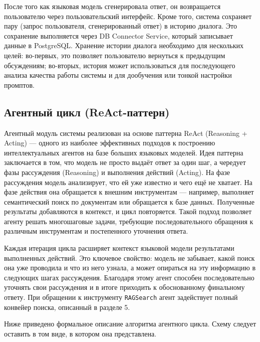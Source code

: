 После того как языковая модель сгенерировала ответ, он возвращается пользователю через пользовательский интерфейс. Кроме того, система сохраняет пару (запрос пользователя, сгенерированный ответ) в историю диалога. Это сохранение выполняется через DB Connector Service, который записывает данные в PostgreSQL. Хранение истории диалога необходимо для нескольких целей: во-первых, это позволяет пользователю вернуться к предыдущим обсуждениям; во-вторых, история может использоваться для последующего анализа качества работы системы и для дообучения или тонкой настройки промптов.



\subsection{Агентный цикл (ReAct-паттерн)}

Агентный модуль системы реализован на основе паттерна ReAct (Reasoning + Acting) — одного из наиболее эффективных подходов к построению интеллектуальных агентов на базе больших языковых моделей. Идея паттерна заключается в том, что модель не просто выдаёт ответ за один шаг, а чередует фазы рассуждения (Reasoning) и выполнения действий (Acting). На фазе рассуждения модель анализирует, что ей уже известно и чего ещё не хватает. На фазе действия она обращается к внешним инструментам — например, выполняет семантический поиск по документам или обращается к базе данных. Полученные результаты добавляются в контекст, и цикл повторяется. Такой подход позволяет агенту решать многошаговые задачи, требующие последовательного обращения к различным инструментам и постепенного уточнения ответа.

Каждая итерация цикла расширяет контекст языковой модели результатами выполненных действий. Это ключевое свойство: модель не забывает, какой поиск она уже проводила и что из него узнала, а может опираться на эту информацию в следующих шагах рассуждения. Благодаря этому агент способен последовательно уточнять свои рассуждения и в итоге приходить к обоснованному финальному ответу. При обращении к инструменту \texttt{RAGSearch} агент задействует полный конвейер поиска, описанный в разделе 5.

Ниже приведено формальное описание алгоритма агентного цикла. Схему следует оставить в том виде, в котором она представлена.

